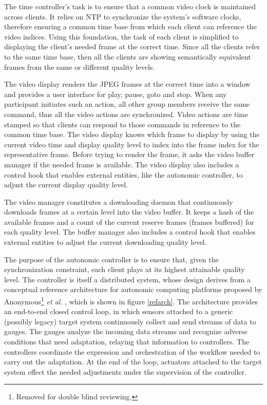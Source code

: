 \documentclass{sig-alternate}
\begin{document}
The time controller's task is to ensure that a common video clock is
maintained across clients.  It relies on NTP to synchronize the
system's software clocks, therefore ensuring a common time base from
which each client can reference the video indices.  Using this
foundation, the task of each client is simplified to displaying the
client's needed frame at the correct time.  Since all the clients
refer to the same time base, then all the clients are showing
semantically equivalent frames from the same or different quality
levels.

The video display renders the JPEG frames at the correct time into a
window and provides a user interface for play, pause, goto and stop.
When any participant initiates such an action, all other group members
receive the same command, thus all the video actions are synchronized.
Video actions are time stamped so that clients can respond to those
commands in reference to the common time base.  The video display
knows which frame to display by using the current video time and
display quality level to index into the frame index for the
representative frame.  Before trying to render the frame, it asks the
video buffer manager if the needed frame is available.  The video
display also includes a control hook that enables external entities,
like the autonomic controller, to adjust the current display quality
level.

The video manager constitutes a downloading daemon that continuously
downloads frames at a certain level into the video buffer.  It keeps a
hash of the available frames and a count of the current reserve frames
(frames buffered) for each quality level.  The buffer manager also
includes a control hook that enables external entities to adjust the
current downloading quality level.


The purpose of the autonomic controller is to ensure that, given the
synchronization constraint, each client plays at its highest
attainable quality level.  The controller is itself a distributed
system, whose design derives from a conceptual reference architecture
for autonomic computing platforms proposed by
Anonymous\footnote{Removed for double blind reviewing.} {\it et al.}
\cite{REFARCH}, which is shown in figure \ref{refarch}. The
architecture provides an end-to-end closed control loop, in which
sensors attached to a generic (possibly legacy) target system
continuously collect and send streams of data to gauges.  The gauges
analyze the incoming data streams and recognize adverse conditions
that need adaptation, relaying that information to controllers.  The
controllers coordinate the expression and orchestration of the
workflow needed to carry out the adaptation.  At the end of the loop,
actuators attached to the target system effect the needed adjustments
under the supervision of the controller.
\end{document}
